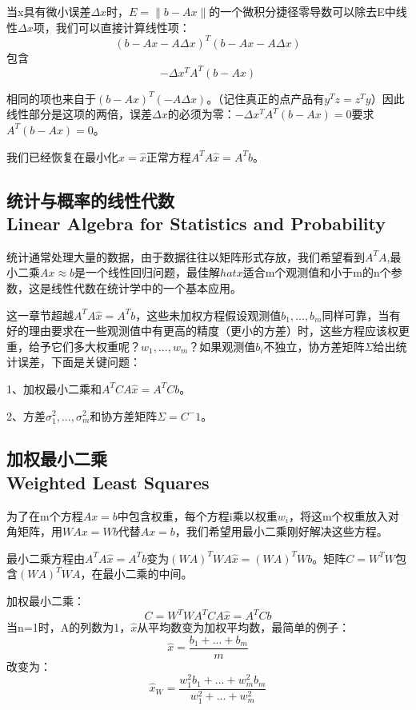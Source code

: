 	当x具有微小误差$\Delta x$时，$E=\|b-Ax\|$的一个微积分捷径零导数可以除去E中线性$\Delta x$项，我们可以直接计算线性项：
	\begin{equation*}
	(b-Ax-A\Delta x)^T(b-Ax-A\Delta x)
	\end{equation*}
	包含
	\begin{equation*}
	-\Delta x^TA^T(b-Ax)
	\end{equation*}
	
	相同的项也来自于$(b-Ax)^T(-A\Delta x)$。（记住真正的点产品有$y^Tz=z^Ty$）因此线性部分是这项的两倍，误差$\Delta x$的必须为零：$-\Delta x^TA^T(b-Ax)=0$要求$A^T(b-Ax)=0$。
	
	我们已经恢复在最小化$x=\hat{x}$正常方程$A^TA\hat{x}=A^Tb$。
	
	\subsection[统计与概率的线性代数]{统计与概率的线性代数\\Linear Algebra for Statistics and Probability}
	统计通常处理大量的数据，由于数据往往以矩阵形式存放，我们希望看到$A^TA$,最小二乘$Ax\approx b$是一个线性回归问题，最佳解$hat{x}$适合m个观测值和小于m的n个参数，这是线性代数在统计学中的一个基本应用。
	
	这一章节超越$A^TA\hat{x}=A^Tb$，这些未加权方程假设观测值$b_1,...,b_m$同样可靠，当有好的理由要求在一些观测值中有更高的精度（更小的方差）时，这些方程应该权更重，给予它们多大权重呢？$w_1,...,w_m$？如果观测值$b_i$不独立，协方差矩阵$\Sigma$给出统计误差，下面是关键问题：
	
	1、加权最小二乘和$A^TCA\hat{x}=A^TCb$。
	
	2、方差$\sigma^2_1,...,\sigma^2_m$和协方差矩阵$\Sigma=C^-1$。
	
	\subsection[加权最小二乘]{加权最小二乘\\Weighted Least Squares}
	为了在m个方程$Ax=b$中包含权重，每个方程i乘以权重$w_i$，将这m个权重放入对角矩阵，用$WAx=Wb$代替$Ax=b$，我们希望用最小二乘刚好解决这些方程。
	
	最小二乘方程由$A^TA\hat{x}=A^Tb$变为$(WA)^TWA\hat{x}=(WA)^TWb$。矩阵$C=W^TW$包含$(WA)^TWA$，在最小二乘的中间。
	
	加权最小二乘：
	\begin{equation}
	C=W^TW    A^TCA\hat{x}=A^TCb
	\end{equation}
	当n=1时，A的列数为1，$\hat{x}$从平均数变为加权平均数，最简单的例子：
	\begin{equation}
	\hat{x}=\frac{b_1+...+b_m}{m}
	\end{equation}
	改变为：
	\begin{equation*}
	\hat{x}_W=\frac{w^2_1b_1+...+w^2_mb_m}{w^2_1+...+w^2_m}
	\end{equation*}
	
